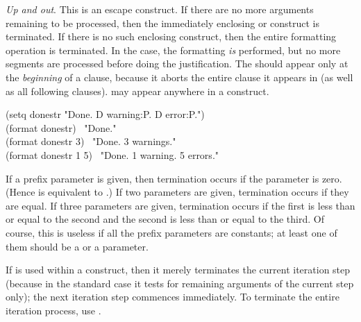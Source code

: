 \begin{flushdesc}
\item[\cd{{\Xtilde}{\Xcircumflex}}]
\emph{Up and out}.
This is an escape construct.  If there are no more arguments remaining to
be processed, then the immediately enclosing \cd{{\Xtilde}{\Xlbrace}} or \cd{{\Xtilde}<} construct
is terminated.  If there is no such enclosing construct, then the entire
formatting operation is terminated.  In the \cd{{\Xtilde}<} case, the formatting
\emph{is} performed, but no more segments are processed before doing the
justification.  The \cd{{\Xtilde}{\Xcircumflex}} should appear only at the \emph{beginning} of a
\cd{{\Xtilde}<} clause, because it aborts the entire clause it appears in (as well
as all following clauses).
\cd{{\Xtilde}{\Xcircumflex}} may appear anywhere in a \cd{{\Xtilde}{\Xlbrace}}
construct.
\begin{lisp}
(setq donestr "Done.{\Xtilde}{\Xcircumflex}  {\Xtilde}D warning{\Xtilde}:P.{\Xtilde}{\Xcircumflex}  {\Xtilde}D error{\Xtilde}:P.") \\
(format {\false} donestr) \EV\ "Done." \\
(format {\false} donestr 3) \EV\ "Done.  3 warnings." \\
(format {\false} donestr 1 5) \EV\ "Done.  1 warning.  5 errors."
\end{lisp}

If a prefix parameter is given, then termination occurs if the parameter
is zero.  (Hence \cd{{\Xtilde}{\Xcircumflex}} is equivalent to \cd{{\Xtilde}\#{\Xcircumflex}}.)  If two
parameters are given, termination occurs if they are equal.  If three
parameters are given, termination occurs if the first is less than or
equal to the second and the second is less than or equal to the third.
Of course, this is useless if all the prefix parameters are constants; at
least one of them should be a \cd{\#} or a  parameter.

If \cd{{\Xtilde}{\Xcircumflex}} is used within a \cd{{\Xtilde}:{\Xlbrace}} construct, then it merely terminates
the current iteration step (because in the standard case it tests for
remaining arguments of the current step only); the next iteration step
commences immediately.  To terminate the entire iteration process,
use \cd{{\Xtilde}:{\Xcircumflex}}.


\end{flushdesc}
